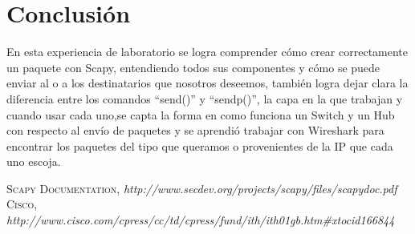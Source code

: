 \documentclass{udpreport}
\begin{document}
 	     
	      

\chapter{Conclusión}
  	      En esta experiencia de laboratorio se logra comprender cómo crear correctamente un paquete con Scapy,
  	      entendiendo todos sus componentes y cómo se puede enviar al o a los destinatarios que nosotros deseemos, también
  	      logra dejar clara la diferencia entre los comandos “send()” y “sendp()”, la capa en la que trabajan y cuando usar cada
  	      uno,se capta la forma en como funciona un Switch y un Hub con respecto al envío de paquetes y se aprendió trabajar con
  	      Wireshark para encontrar los paquetes del tipo que queramos o provenientes de la IP que cada uno  escoja.
\begin{thebibliography}{x}
 \textsc{Scapy Documentation},
\textit{http://www.secdev.org/projects/scapy/files/scapydoc.pdf}
 \textsc{Cisco},
\textit{ http://www.cisco.com/cpress/cc/td/cpress/fund/ith/ith01gb.htm#xtocid166844}
\end{thebibliography}
\end{document}
